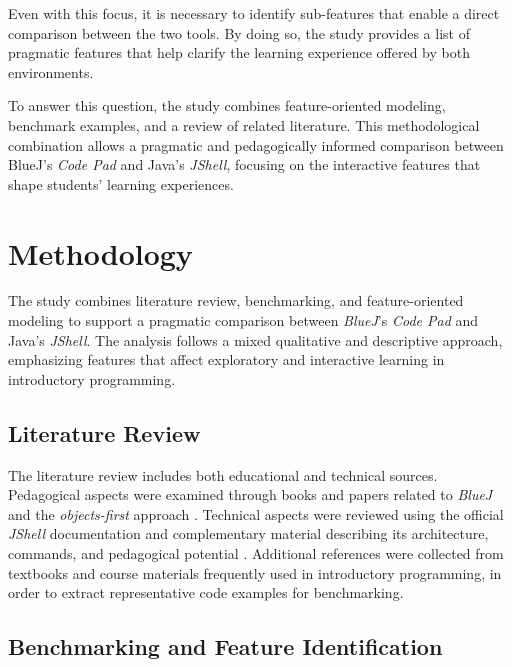 \documentclass{article}
\begin{document}
Even with this focus, it is necessary to identify sub-features that enable a direct comparison between the two tools. By doing so, the study provides a list of pragmatic features that help clarify the learning experience offered by both environments.


To answer this question, the study combines feature-oriented modeling, benchmark examples, and a review of related literature. This methodological combination allows a pragmatic and pedagogically informed comparison between BlueJ’s \textit{Code Pad} and Java’s \textit{JShell}, focusing on the interactive features that shape students’ learning experiences.

\section{Methodology}

The study combines literature review, benchmarking, and feature-oriented modeling to support a pragmatic comparison between \textit{BlueJ}’s \textit{Code Pad} and Java’s \textit{JShell}. The analysis follows a mixed qualitative and descriptive approach, emphasizing features that affect exploratory and interactive learning in introductory programming.

\subsection{Literature Review}

The literature review includes both educational and technical sources. Pedagogical aspects were examined through books and papers related to \textit{BlueJ} and the \textit{objects-first} approach \cite{barnes2008objects, bluej_paper}. Technical aspects were reviewed using the official \textit{JShell} documentation and complementary material describing its architecture, commands, and pedagogical potential \cite{jshell_docs}. Additional references were collected from textbooks and course materials frequently used in introductory programming, in order to extract representative code examples for benchmarking.

\subsection{Benchmarking and Feature Identification}
\end{document}
